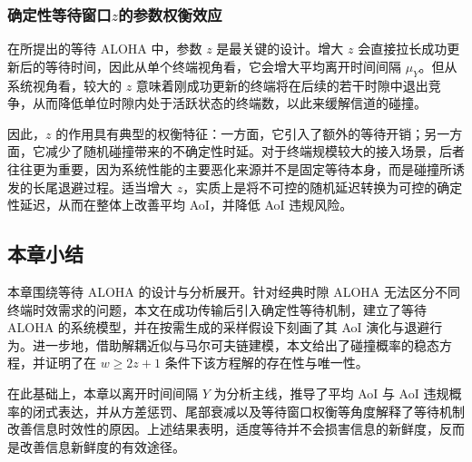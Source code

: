 \subsubsection{确定性等待窗口\texorpdfstring{$z$}{z}的参数权衡效应}

在所提出的等待 ALOHA 中，参数 $z$ 是最关键的设计。增大 $z$ 会直接拉长成功更新后的等待时间，因此从单个终端视角看，它会增大平均离开时间间隔 $\mu_Y$。但从系统视角看，较大的 $z$ 意味着刚成功更新的终端将在后续的若干时隙中退出竞争，从而降低单位时隙内处于活跃状态的终端数，以此来缓解信道的碰撞。

因此，$z$ 的作用具有典型的权衡特征：一方面，它引入了额外的等待开销；另一方面，它减少了随机碰撞带来的不确定性时延。对于终端规模较大的接入场景，后者往往更为重要，因为系统性能的主要恶化来源并不是固定等待本身，而是碰撞所诱发的长尾退避过程。适当增大 $z$，实质上是将不可控的随机延迟转换为可控的确定性延迟，从而在整体上改善平均 AoI，并降低 AoI 违规风险。

\subsection{本章小结}

本章围绕等待 ALOHA 的设计与分析展开。针对经典时隙 ALOHA 无法区分不同终端时效需求的问题，本文在成功传输后引入确定性等待机制，建立了等待 ALOHA 的系统模型，并在按需生成的采样假设下刻画了其 AoI 演化与退避行为。进一步地，借助解耦近似与马尔可夫链建模，本文给出了碰撞概率的稳态方程，并证明了在 $w\ge 2z+1$ 条件下该方程解的存在性与唯一性。

在此基础上，本章以离开时间间隔 $Y$ 为分析主线，推导了平均 AoI 与 AoI 违规概率的闭式表达，并从方差惩罚、尾部衰减以及等待窗口权衡等角度解释了等待机制改善信息时效性的原因。上述结果表明，适度等待并不会损害信息的新鲜度，反而是改善信息新鲜度的有效途径。
